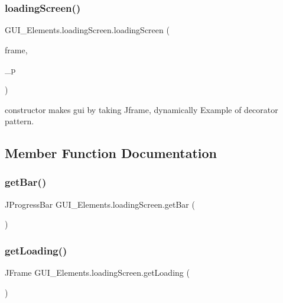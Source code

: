 \subsubsection{\texorpdfstring{loading\+Screen()}{loadingScreen()}}
{\footnotesize\ttfamily G\+U\+I\+\_\+\+Elements.\+loading\+Screen.\+loading\+Screen (\begin{DoxyParamCaption}\item[{J\+Frame}]{frame,  }\item[{int}]{\+\_\+p }\end{DoxyParamCaption})}

constructor makes gui by taking Jframe, dynamically Example of decorator pattern. 

\subsection{Member Function Documentation}
\hypertarget{class_g_u_i___elements_1_1loading_screen_a1cd168a3031086c3d15708213dd11a4b}{}\label{class_g_u_i___elements_1_1loading_screen_a1cd168a3031086c3d15708213dd11a4b} 
\subsubsection{\texorpdfstring{get\+Bar()}{getBar()}}
{\footnotesize\ttfamily J\+Progress\+Bar G\+U\+I\+\_\+\+Elements.\+loading\+Screen.\+get\+Bar (\begin{DoxyParamCaption}{ }\end{DoxyParamCaption})}

\hypertarget{class_g_u_i___elements_1_1loading_screen_a565b95f52e78c18e62ccb633ebb9fc49}{}\label{class_g_u_i___elements_1_1loading_screen_a565b95f52e78c18e62ccb633ebb9fc49} 
\subsubsection{\texorpdfstring{get\+Loading()}{getLoading()}}
{\footnotesize\ttfamily J\+Frame G\+U\+I\+\_\+\+Elements.\+loading\+Screen.\+get\+Loading (\begin{DoxyParamCaption}{ }\end{DoxyParamCaption})}

